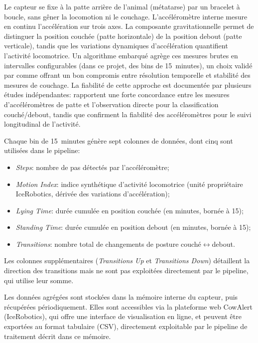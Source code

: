 Le capteur se fixe à la patte arrière de l'animal (métatarse) par un bracelet à boucle, sans
gêner la locomotion ni le couchage. L'accéléromètre interne mesure en continu l'accélération
sur trois axes. La composante gravitationnelle permet de distinguer la position couchée
(patte horizontale) de la position debout (patte verticale), tandis que les variations
dynamiques d'accélération quantifient l'activité locomotrice. Un algorithme embarqué agrège
ces mesures brutes en intervalles configurables (dans ce projet, des bins de 15~minutes),
un choix validé par \cite{ledgerwood2010lying} comme offrant un bon compromis entre
résolution temporelle et stabilité des mesures de couchage. La fiabilité de cette approche
est documentée par plusieurs études indépendantes: \cite{alsaaod2012electronic} rapportent
une forte concordance entre les mesures d'accéléromètres de patte et l'observation directe
pour la classification couché/debout, tandis que \cite{blackie2011automatic} confirment la
fiabilité des accéléromètres pour le suivi longitudinal de l'activité.

Chaque bin de 15~minutes génère sept colonnes de données, dont cinq sont utilisées dans le
pipeline:
\begin{itemize}
    \item \textit{Steps}: nombre de pas détectés par l'accéléromètre;
    \item \textit{Motion Index}: indice synthétique d'activité locomotrice (unité
    propriétaire IceRobotics, dérivée des variations d'accélération);
    \item \textit{Lying Time}: durée cumulée en position couchée (en minutes, bornée à 15);
    \item \textit{Standing Time}: durée cumulée en position debout (en minutes, bornée à 15);
    \item \textit{Transitions}: nombre total de changements de posture
    couché$\leftrightarrow$debout.
\end{itemize}
Les colonnes supplémentaires (\textit{Transitions Up} et \textit{Transitions Down})
détaillent la direction des transitions mais ne sont pas exploitées directement par le
pipeline, qui utilise leur somme.

Les données agrégées sont stockées dans la mémoire interne du capteur, puis récupérées
périodiquement. Elles sont accessibles via la plateforme web CowAlert (IceRobotics), qui
offre une interface de visualisation en ligne, et peuvent être exportées au format tabulaire
(CSV), directement exploitable par le pipeline de traitement décrit dans ce mémoire.

